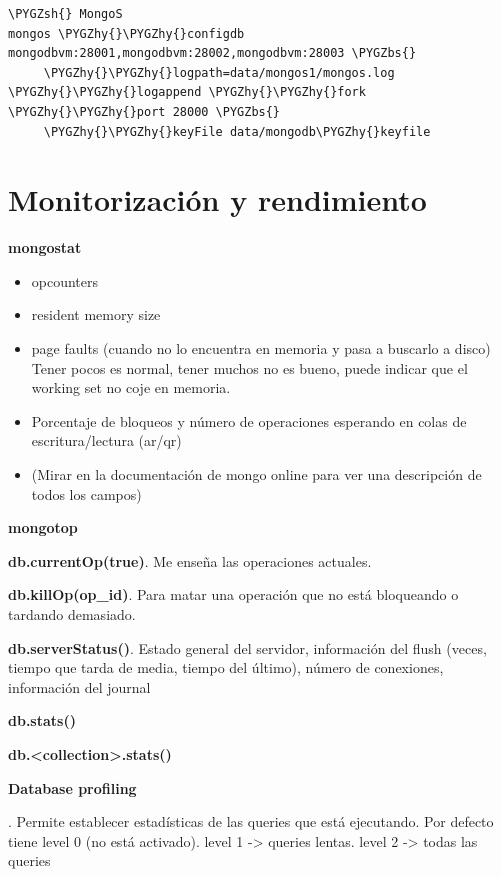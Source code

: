 \documentclass[a4paper,10pt,english]{sphinxmanual}
\def\PYGZbs{\char`\\}
\def\PYGZsh{\char`\#}
\def\PYGZhy{\char`\-}
\begin{document}
\begin{Verbatim}[commandchars=\\\{\}]
\PYGZsh{} MongoS
mongos \PYGZhy{}\PYGZhy{}configdb mongodbvm:28001,mongodbvm:28002,mongodbvm:28003 \PYGZbs{}
     \PYGZhy{}\PYGZhy{}logpath=data/mongos1/mongos.log \PYGZhy{}\PYGZhy{}logappend \PYGZhy{}\PYGZhy{}fork \PYGZhy{}\PYGZhy{}port 28000 \PYGZbs{}
     \PYGZhy{}\PYGZhy{}keyFile data/mongodb\PYGZhy{}keyfile
\end{Verbatim}


\chapter{Monitorización y rendimiento}
\label{contents/monitor::doc}\label{contents/monitor:monitorizacion-y-rendimiento}
\textbf{mongostat}
\begin{itemize}
\item {} 
opcounters

\item {} 
resident memory size

\item {} 
page faults (cuando no lo encuentra en memoria y pasa a buscarlo a disco) Tener pocos es normal, tener muchos no es bueno, puede indicar que el working set no coje en memoria.

\item {} 
Porcentaje de bloqueos y número de operaciones esperando en colas de escritura/lectura (ar/qr)

\item {} 
(Mirar en la documentación de mongo online para ver una descripción de todos los campos)

\end{itemize}

\textbf{mongotop}

\textbf{db.currentOp(true)}. Me enseña las operaciones actuales.

\textbf{db.killOp(op\_id)}. Para matar una operación que no está bloqueando o tardando demasiado.

\textbf{db.serverStatus()}. Estado general del servidor, información del flush (veces, tiempo que tarda de media, tiempo del último), número de conexiones, información del journal

\textbf{db.stats()}

\textbf{db.\textless{}collection\textgreater{}.stats()}

\textbf{Database profiling}

. Permite establecer estadísticas de las queries que está ejecutando. Por defecto tiene level 0 (no está activado). level 1 -\textgreater{} queries lentas. level 2 -\textgreater{} todas las queries
\end{document}
